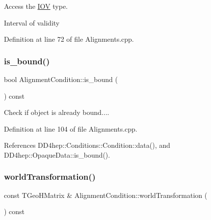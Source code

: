 Access the \hyperlink{class_d_d4hep_1_1_i_o_v}{I\+OV} type. 

Interval of validity 

Definition at line 72 of file Alignments.\+cpp.

\hypertarget{class_d_d4hep_1_1_alignments_1_1_alignment_condition_a606d7b95919cd2c0d0d96e1a50f6bdcf}{}\label{class_d_d4hep_1_1_alignments_1_1_alignment_condition_a606d7b95919cd2c0d0d96e1a50f6bdcf} 
\subsubsection{\texorpdfstring{is\+\_\+bound()}{is\_bound()}}
{\footnotesize\ttfamily bool Alignment\+Condition\+::is\+\_\+bound (\begin{DoxyParamCaption}{ }\end{DoxyParamCaption}) const}



Check if object is already bound.... 



Definition at line 104 of file Alignments.\+cpp.



References D\+D4hep\+::\+Conditions\+::\+Condition\+::data(), and D\+D4hep\+::\+Opaque\+Data\+::is\+\_\+bound().

\hypertarget{class_d_d4hep_1_1_alignments_1_1_alignment_condition_ac209668b15833f27dc0d093b23fb4021}{}\label{class_d_d4hep_1_1_alignments_1_1_alignment_condition_ac209668b15833f27dc0d093b23fb4021} 
\subsubsection{\texorpdfstring{world\+Transformation()}{worldTransformation()}}
{\footnotesize\ttfamily const T\+Geo\+H\+Matrix \& Alignment\+Condition\+::world\+Transformation (\begin{DoxyParamCaption}{ }\end{DoxyParamCaption}) const}



